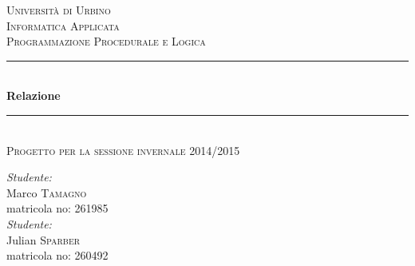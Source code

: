 \documentclass[11pt, a4paper, titlepage, block]{article}
\begin{document}
	\begin{titlepage}

		\newcommand{\HRule}{\rule{\linewidth}{0.5mm}} %

		\center %


		\textsc{\LARGE Universit\`a di Urbino}\\[1.5cm] %
		\textsc{\Large Informatica Applicata}\\[0.5cm] %
		\textsc{\large Programmazione Procedurale e Logica}\\[0.5cm] %



		\HRule \\[0.4cm]
		{ \huge \bfseries Relazione}\\[0.2cm] %
		\HRule \\[0.4cm]
		\textsc{\large Progetto per la sessione invernale 2014/2015}
		\\[2cm]

		\begin{minipage}{\textwidth}
			\begin{flushleft}
				\emph{Studente:}\\
				Marco \textsc{Tamagno}\\ %
				matricola no: 261985
				\\[1cm]
				\emph{Studente:}\\
				Julian \textsc{Sparber}\\ %
				matricola no: 260492\\
			\end{flushleft}
		\end{minipage}\\[3cm]


\end{titlepage}
\end{document}
